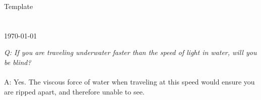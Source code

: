 \documentclass[9pt]{article}
\newcommand{\hwname}{Template}
\begin{document}
\pagestyle{plain}

\begin{center}
{\Large \hwname} \\
\myname \\
\myandrew \\
\today
\end{center}

\textit{Q: If you are traveling underwater faster than the speed of light in water, will you be blind?} \\\\
A: Yes. The viscous force of water when traveling at this speed would ensure you are ripped apart, and therefore unable to see.
\end{document}
